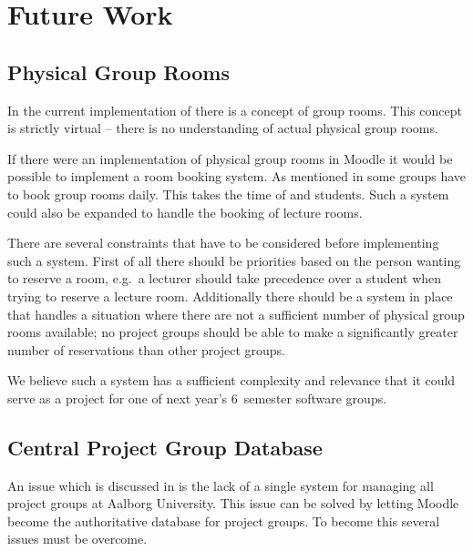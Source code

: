 \chapter{Future Work}
\label{chap:futurework}


\section{Physical Group Rooms}
\label{sec:booking}
In the current implementation of \system{} there is a concept of group rooms.
This concept is strictly virtual -- there is no understanding of actual physical group rooms.

If there were an implementation of physical group rooms in Moodle it would be possible to implement a room booking system.
As mentioned in  some groups have to book group rooms daily.
This takes the time of \amdpers{} and students.
Such a system could also be expanded to handle the booking of lecture rooms.

There are several constraints that have to be considered before implementing such a system.
First of all there should be priorities based on the person wanting to reserve a room, e.g.\ a lecturer should take precedence over a student when trying to reserve a lecture room.
Additionally there should be a system in place that handles a situation where there are not a sufficient number of physical group rooms available; no project groups should be able to make a significantly greater number of reservations than other project groups.

We believe such a system has a sufficient complexity and relevance that it could serve as a project for one of next year's $6$\ths~semester software groups.

\section{Central Project Group Database}
An issue which is discussed in  is the lack of a single system for managing all project groups at Aalborg University. 
This issue can be solved by letting Moodle become the authoritative database for project groups. 
To become this several issues must be overcome. 

